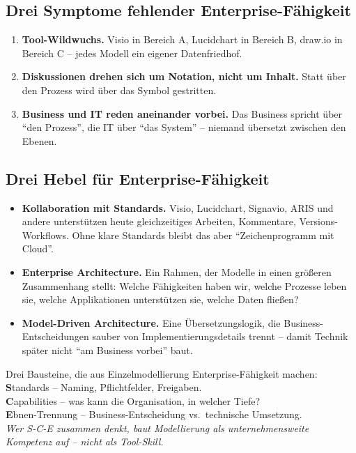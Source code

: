\documentclass[11pt,a4paper,oneside]{article}
\newcommand{\caveatfontfallback}{\itshape}
\newcommand\caveatfont{\caveatfontfallback}%
\newcommand{\akzent}[1]{{\caveatfont\color{lpAmber}#1}}
\newcommand{\fachbegriff}[1]{\textbf{#1}}
\begin{document}
\subsection{Drei Symptome fehlender Enterprise-Fähigkeit}

\begin{enumerate}
  \item \fachbegriff{Tool-Wildwuchs.} Visio in Bereich A, Lucidchart in Bereich B, draw.io in Bereich C -- jedes Modell ein eigener Datenfriedhof.
  \item \fachbegriff{Diskussionen drehen sich um Notation, nicht um Inhalt.} Statt über den Prozess wird über das Symbol gestritten.
  \item \fachbegriff{Business und IT reden aneinander vorbei.} Das Business spricht über ``den Prozess'', die IT über ``das System'' -- niemand übersetzt zwischen den Ebenen.
\end{enumerate}

\subsection{Drei Hebel für Enterprise-Fähigkeit}

\begin{itemize}
  \item \fachbegriff{Kollaboration mit Standards.} Visio, Lucidchart, Signavio, ARIS und andere unterstützen heute gleichzeitiges Arbeiten, Kommentare, Versions-Workflows. Ohne klare Standards bleibt das aber ``Zeichenprogramm mit Cloud''.
  \item \fachbegriff{Enterprise Architecture.} Ein Rahmen, der Modelle in einen größeren Zusammenhang stellt: Welche Fähigkeiten haben wir, welche Prozesse leben sie, welche Applikationen unterstützen sie, welche Daten fließen?
  \item \fachbegriff{Model-Driven Architecture.} Eine Übersetzungslogik, die Business-Entscheidungen sauber von Implementierungsdetails trennt -- damit Technik später nicht ``am Business vorbei'' baut.
\end{itemize}

\begin{eselsbox}[Eselsbrücke: \akzent{S-C-E}]
Drei Bausteine, die aus Einzelmodellierung Enterprise-Fähigkeit machen:\\[2pt]
\textbf{S}tandards -- Naming, Pflichtfelder, Freigaben.\\
\textbf{C}apabilities -- was kann die Organisation, in welcher Tiefe?\\
\textbf{E}bnen-Trennung -- Business-Entscheidung vs.\ technische Umsetzung.\\[2pt]
\emph{Wer S-C-E zusammen denkt, baut Modellierung als unternehmensweite Kompetenz auf -- nicht als Tool-Skill.}
\end{eselsbox}
\end{document}
